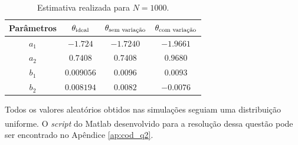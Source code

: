 \begin{table}
\centering
    \caption{Estimativa realizada para $N = 1000$.}
    \label{tab:estimativa_1000_2}
    \vspace{0.25cm}
    \begin{tabular}{|c|c|c|c|}
        \hline
        Parâmetros & 
        $\mathbf{\theta}_{\text{ideal}}$&
        $\mathbf{\theta}_{\text{sem variação}}$&
        $\mathbf{\theta}_{\text{com variação}}$\\
        \hline
        \hline
        $a_1$ & $-1.724$   & $-1.7240$ & $-1.9661$ \\
        \hline
        $a_2$ & $0.7408$   & $0.7408$  & $0.9680$ \\
        \hline
        $b_1$ & $0.009056$ & $0.0096$  & $0.0093$ \\
        \hline
        $b_2$ & $0.008194$ & $0.0082$  & $-0.0076$ \\
        \hline
    \end{tabular}
\end{table}

Todos os valores aleatórios obtidos nas simulações seguiam uma distribuição
uniforme. O {\it script} do Matlab\textsuperscript{\textregistered} desenvolvido
para a resolução dessa questão pode ser encontrado no Apêndice \ref{ap:cod_q2}.
